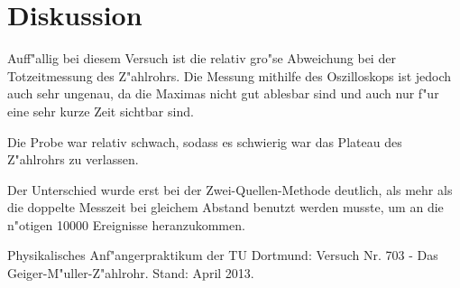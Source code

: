 \section{Diskussion}
	\label{diskussion}

	Auff"allig bei diesem Versuch ist die relativ gro"se Abweichung bei der Totzeitmessung des Z"ahlrohrs.
	Die Messung mithilfe des Oszilloskops ist jedoch auch sehr ungenau, da die Maximas nicht gut ablesbar sind und auch nur f"ur eine sehr kurze Zeit sichtbar sind.

	Die Probe war relativ schwach, sodass es schwierig war das Plateau des Z"ahlrohrs zu verlassen.

	Der Unterschied wurde erst bei der Zwei-Quellen-Methode deutlich, als mehr als die doppelte Messzeit bei gleichem Abstand benutzt werden musste, um an die n"otigen 10000 Ereignisse heranzukommen.

	

\begin{thebibliography}{9}
	 Physikalisches Anf"angerpraktikum der TU Dortmund: Versuch Nr. 703 - Das Geiger-M"uller-Z"ahlrohr. Stand: April 2013.
\end{thebibliography}
